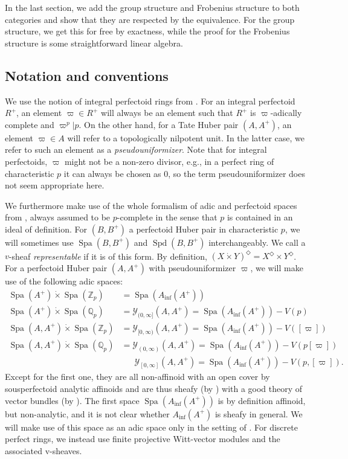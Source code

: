 \documentclass[10pt,twoside]{article}
\numberwithin{equation}{section}
\theoremstyle{plain}
\theoremstyle{definition}
\DeclareMathOperator{\Spa}{Spa}
\DeclareMathOperator{\Spd}{Spd}
\newcommand{\ZZ}{\mathbb{Z}}
\newcommand{\QQ}{\mathbb{Q}}
\newcommand{\MCY}{\mathcal{Y}}
\let \diamond \Diamond
\DeclareMathOperator{\Inf}{inf}
\newcommand{\Ainf}{A_{\Inf}}
\newcommand{\Ycc}{\MCY_{[0,\infty]}}
\newcommand{\Yco}{\MCY_{[0,\infty)}}
\newcommand{\Yoc}{\MCY_{(0,\infty]}}
\newcommand{\Yoo}{\MCY_{(0,\infty)}}
\begin{document}
In the last section, we add the group structure and Frobenius structure to both categories and show that they are respected by the equivalence. For the group structure, we get this for free by exactness, while the proof for the Frobenius structure is some straightforward linear algebra.


\subsection*{Notation and conventions}

We use the notion of integral perfectoid rings from \cite{BMS19}. For an integral perfectoid \(R^+\), an element \(\varpi\in R^+\) will always be an element such that \(R^+\) is \(\varpi\)-adically complete and \(\varpi^p|p\). On the other hand, for a Tate Huber pair \((A,A^+)\), an element \(\varpi\in A\) will refer to a topologically nilpotent unit. In the latter case, we refer to such an element as a \emph{pseudouniformizer}. Note that for integral perfectoids, \(\varpi\) might not be a non-zero divisor, e.g., in a perfect ring of characteristic \(p\) it can always be chosen as \(0\), so the term pseudouniformizer does not seem appropriate here.\par
We furthermore make use of the whole formalism of adic and perfectoid spaces from \cite{SW20}, always assumed to be \(p\)-complete in the sense that \(p\) is contained in an ideal of definition. For \((B,B^+)\) a perfectoid Huber pair in characteristic \(p\), we will sometimes use \(\Spa(B,B^+)\) and \(\Spd(B,B^+)\) interchangeably. We call a \(v\)-sheaf \emph{representable} if it is of this form. By definition, \((X\dot\times Y)^{\diamond}=X^\diamond \times Y^\diamond\). For a perfectoid Huber pair \((A,A^+)\) with pseudouniformizer \(\varpi\), we will make use of the following adic spaces:
\begin{align*}
\Spa(A^+)\dot\times \Spa(\ZZ_p)&=\Spa(\Ainf(A^+))\\
\Spa(A^+)\dot\times \Spa(\QQ_p)&=\Yoc(A,A^+)=\Spa(\Ainf(A^+))-V(p)\\
\Spa(A,A^+)\dot\times \Spa(\ZZ_p)&=\Yco(A,A^+)=\Spa(\Ainf(A^+))-V([\varpi])\\
\Spa(A,A^+)\dot\times \Spa(\QQ_p)&=\Yoo(A,A^+)=\Spa(\Ainf(A^+))-V(p[\varpi])\\
&\quad\;\;\Ycc(A,A^+)=\Spa(\Ainf(A^+))-V(p,[\varpi]).
\end{align*}
Except for the first one, they are all non-affinoid with an open cover by sousperfectoid analytic affinoids and are thus sheafy (by \cite[Proposition 6.3.4]{SW20}) with a good theory of vector bundles (by \cite[Theorem 5.2.8]{SW20}). The first space \(\Spa(\Ainf(A^+))\) is by definition affinoid, but non-analytic, and it is not clear whether \(\Ainf(A^+)\) is sheafy in general. We will make use of this space as an adic space only in the setting of . For discrete perfect rings, we instead use finite projective Witt-vector modules and the associated v-sheaves.\par
\end{document}
